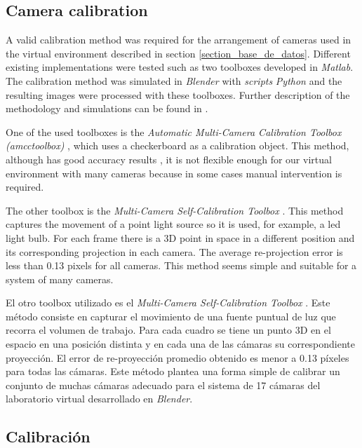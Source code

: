 \subsection{Camera calibration}\label{calibracion}

A valid calibration method was required for the arrangement of cameras used in the virtual environment described in section \ref{section_base_de_datos}. Different existing implementations were tested such as two toolboxes developed in \emph{Matlab}. The calibration method was simulated in \emph{Blender} with \textit{scripts} \emph{Python} and the resulting images were processed with these toolboxes. Further description of the methodology and simulations can be found in \cite{proyecto_biomecanica}.

One of the used toolboxes is the \textit{Automatic Multi-Camera Calibration Toolbox (amcctoolbox)} \cite{amcctoolbox}, which uses a checkerboard as a calibration object. This method, although has good accuracy results \cite{zhang_libro}, it is not flexible enough for our virtual environment with many cameras because in some cases manual intervention is required. 

The other toolbox is the \textit{Multi-Camera Self-Calibration Toolbox} \cite{toolbox_led}. This method captures the movement of a point light source so it is used, for example, a led light bulb. For each frame there is a 3D point in space in a different position and its corresponding projection in each camera. The average re-projection error is less than 0.13 pixels for all cameras. This method seems simple and suitable for a system of many cameras.

\begin{flushright}
El otro toolbox utilizado es el \textit{Multi-Camera Self-Calibration Toolbox} \cite{toolbox_led}. Este método consiste en capturar el movimiento de una fuente puntual de luz que recorra el volumen de trabajo. Para cada cuadro se tiene un punto 3D en el espacio en una posición distinta y en cada una de las cámaras su correspondiente proyección.
 El error de re-proyección promedio obtenido es menor a 0.13 píxeles para todas las cámaras. Este método plantea una forma simple de calibrar un conjunto de muchas cámaras adecuado para el sistema de 17 cámaras del laboratorio virtual desarrollado en \emph{Blender}.
\end{flushright}

\subsection{Calibración}\label{calibracion}


